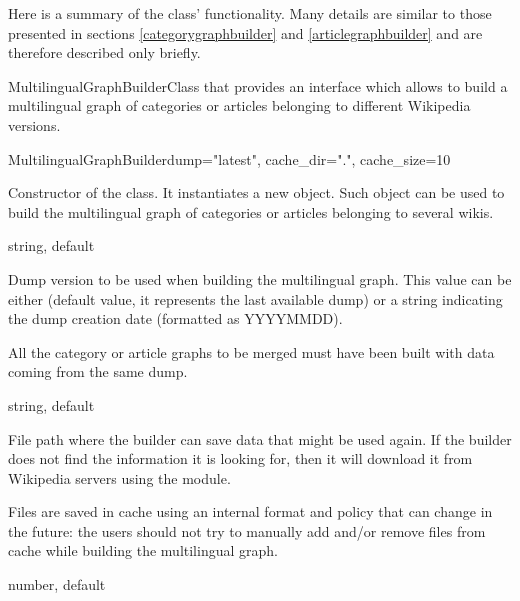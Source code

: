             Here is a summary of the class' functionality. Many details are similar to those presented in sections \ref{categorygraphbuilder} and \ref{articlegraphbuilder} and are therefore described only briefly.
            \begin{classdoc}{MultilingualGraphBuilder}{Class that provides an interface which allows to build a multilingual graph of categories or articles belonging to different Wikipedia versions.}
                \item \begin{classmethod}{MultilingualGraphBuilder}{dump="latest", cache\_dir=".", cache\_size=10}
                
                    \begin{functiondescription}
                        Constructor of the class. It instantiates a new  object. Such object can be used to build the multilingual graph of categories or articles belonging to several wikis.
                    \end{functiondescription}
                    
                    \begin{functionparameters}
                        \item[dump] string, default 

                        Dump version to be used when building the multilingual graph. This value can be either  (default value, it represents the last available dump) or a string indicating the dump creation date (formatted as YYYYMMDD).
                        
                        All the category or article graphs to be merged must have been built with data coming from the same dump.
                        \item[cache\_dir] string, default 
                    
                        File path where the builder can save data that might be used again. If the builder does not find the information it is looking for, then it will download it from Wikipedia servers using the  module.
                        
                        Files are saved in cache using an internal format and policy that can change in the future: the users should not try to manually add and/or remove files from cache while building the multilingual graph.
                        \item[cache\_size] number, default 
                    

\end{functionparameters}
\end{classmethod}
\end{classdoc}

